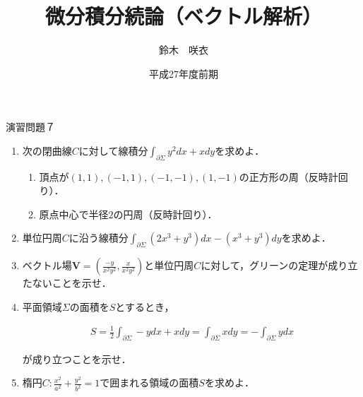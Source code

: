 \documentclass{jarticle}
\begin{document}
\title{微分積分続論（ベクトル解析）} 
\author{鈴木　咲衣}
\date{平成27年度前期}
\maketitle

\begin{center} {\Large 演習問題７ } \end{center}
\begin{enumerate}
\item \cite[練習問題5.5]{tani} 次の閉曲線$C$に対して線積分$\int_{\partial \Sigma}y^{2}dx + xdy$を求めよ．
\begin{enumerate}
\item 頂点が$(1,1), (-1,1), (-1,-1), (1,-1)$の正方形の周（反時計回り）．
\item 原点中心で半径$2$の円周（反時計回り）．
\end{enumerate}
\item \cite[練習問題5.3]{tani} 単位円周$C$に沿う線積分$\int_{\partial \Sigma}(2x^{3}+y^{3})dx -  (x^{3}+y^{3})dy$を求めよ．
\item  \cite[練習問題5.4]{tani} ベクトル場$\bm V=(\frac{-y}{x^{2}y^{2}}, \frac{x}{x^{2}y^{2}})$と単位円周$C$に対して，グリーンの定理が成り立たないことを示せ．
\item \cite[問題8.8, 8.2]{koba} 平面領域$\Sigma$の面積を$S$とするとき，


\begin{align}
S=\frac{1}{2}\int _{\partial \Sigma}-ydx+xdy =
\int _{\partial \Sigma}xdy=
-\int _{\partial \Sigma}ydx
\end{align}

が成り立つことを示せ．
\item \cite[問題8.9]{koba} 楕円$C: \frac{x^{2}}{a^{2}}+\frac{y^{2}}{b^{2}}=1$で囲まれる領域の面積$S$を求めよ．

\end{enumerate}
\newpage
\end{document}
